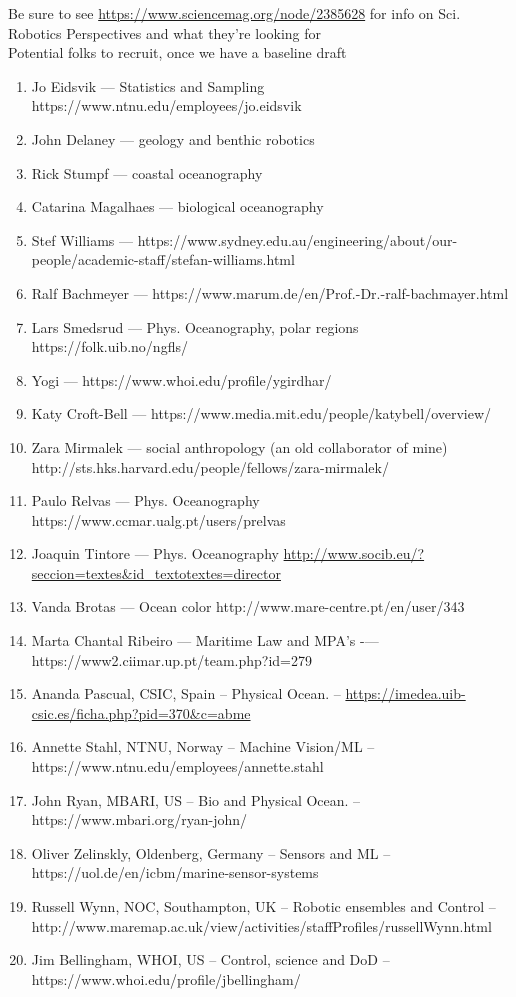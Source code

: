 \newpage
\large{Be sure to see \url{https://www.sciencemag.org/node/2385628}
  for info on
  Sci. Robotics Perspectives and what they're looking for}\\


Potential folks to recruit, once we have a baseline draft

\begin{enumerate}[noitemsep,topsep=0pt,parsep=0pt,partopsep=0pt]
  
\item Jo Eidsvik — Statistics and Sampling https://www.ntnu.edu/employees/jo.eidsvik
\item John Delaney — geology and benthic robotics
\item Rick Stumpf — coastal oceanography 
\item Catarina Magalhaes — biological oceanography
\item Stef Williams — https://www.sydney.edu.au/engineering/about/our-people/academic-staff/stefan-williams.html
\item Ralf Bachmeyer — https://www.marum.de/en/Prof.-Dr.-ralf-bachmayer.html
\item Lars Smedsrud — Phys. Oceanography, polar regions https://folk.uib.no/ngfls/
\item Yogi — https://www.whoi.edu/profile/ygirdhar/
\item Katy Croft-Bell  — https://www.media.mit.edu/people/katybell/overview/
\item Zara Mirmalek — social anthropology (an old collaborator of mine) http://sts.hks.harvard.edu/people/fellows/zara-mirmalek/
\item Paulo Relvas — Phys. Oceanography https://www.ccmar.ualg.pt/users/prelvas
\item Joaquin Tintore — Phys. Oceanography \url{http://www.socib.eu/?seccion=textes&id_textotextes=director}
\item Vanda Brotas — Ocean color http://www.mare-centre.pt/en/user/343
\item Marta Chantal Ribeiro — Maritime Law and MPA’s -— https://www2.ciimar.up.pt/team.php?id=279
\item Ananda Pascual, CSIC, Spain -- Physical Ocean. -- \url{https://imedea.uib-csic.es/ficha.php?pid=370&c=abme}
\item Annette Stahl, NTNU, Norway -- Machine Vision/ML -- https://www.ntnu.edu/employees/annette.stahl
\item John Ryan, MBARI, US -- Bio and Physical Ocean. -- https://www.mbari.org/ryan-john/
\item Oliver Zelinskly, Oldenberg, Germany -- Sensors and ML -- https://uol.de/en/icbm/marine-sensor-systems
\item Russell Wynn, NOC, Southampton, UK  -- Robotic ensembles and
  Control -- http://www.maremap.ac.uk/view/activities/staffProfiles/russellWynn.html
\item Jim Bellingham, WHOI, US -- Control, science and DoD  -- https://www.whoi.edu/profile/jbellingham/

\end{enumerate}
